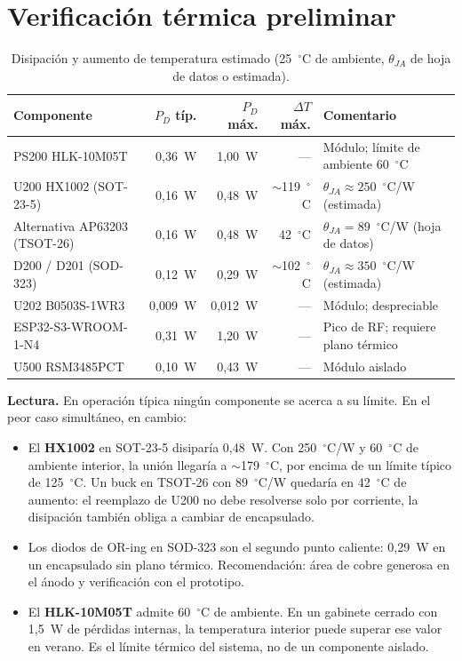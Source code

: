 \documentclass[11pt,a4paper]{article}
\begin{document}
\section{Verificación térmica preliminar}
\label{sec:termica}

\begin{table}[H]
\centering
\caption{Disipación y aumento de temperatura estimado (25~$^\circ$C de ambiente,
$\theta_{JA}$ de hoja de datos o estimada).}
\label{tab:termica}
\small
\begin{tabularx}{\textwidth}{@{}X r r r l@{}}
\toprule
\textbf{Componente} & \textbf{$P_D$ típ.} & \textbf{$P_D$ máx.} & \textbf{$\Delta T$ máx.} & \textbf{Comentario} \\
\midrule
PS200 HLK-10M05T & 0,36~W & 1,00~W & --- & Módulo; límite de ambiente 60~$^\circ$C \\
U200 HX1002 (SOT-23-5) & 0,16~W & 0,48~W & $\sim$119~$^\circ$C & $\theta_{JA}\approx250$~$^\circ$C/W (estimada) \\
Alternativa AP63203 (TSOT-26) & 0,16~W & 0,48~W & 42~$^\circ$C & $\theta_{JA}=89$~$^\circ$C/W (hoja de datos) \\
D200 / D201 (SOD-323) & 0,12~W & 0,29~W & $\sim$102~$^\circ$C & $\theta_{JA}\approx350$~$^\circ$C/W (estimada) \\
U202 B0503S-1WR3 & 0,009~W & 0,012~W & --- & Módulo; despreciable \\
ESP32-S3-WROOM-1-N4 & 0,31~W & 1,20~W & --- & Pico de RF; requiere plano térmico \\
U500 RSM3485PCT & 0,10~W & 0,43~W & --- & Módulo aislado \\
\bottomrule
\end{tabularx}
\end{table}

\noindent \textbf{Lectura.} En operación típica ningún componente se acerca a su
límite. En el peor caso simultáneo, en cambio:

\begin{itemize}
  \item El \textbf{HX1002} en SOT-23-5 disiparía 0,48~W. Con 250~$^\circ$C/W y
        60~$^\circ$C de ambiente interior, la unión llegaría a
        $\sim$179~$^\circ$C, por encima de un límite típico de 125~$^\circ$C. Un
        buck en TSOT-26 con 89~$^\circ$C/W quedaría en 42~$^\circ$C de aumento:
        el reemplazo de U200 no debe resolverse solo por corriente, la
        disipación también obliga a cambiar de encapsulado.
  \item Los diodos de OR-ing en SOD-323 son el segundo punto caliente: 0,29~W en
        un encapsulado sin plano térmico. Recomendación: área de cobre generosa
        en el ánodo y verificación con el prototipo.
  \item El \textbf{HLK-10M05T} admite 60~$^\circ$C de ambiente. En un gabinete
        cerrado con 1,5~W de pérdidas internas, la temperatura interior puede
        superar ese valor en verano. Es el límite térmico del sistema, no de un
        componente aislado.
\end{itemize}
\end{document}
